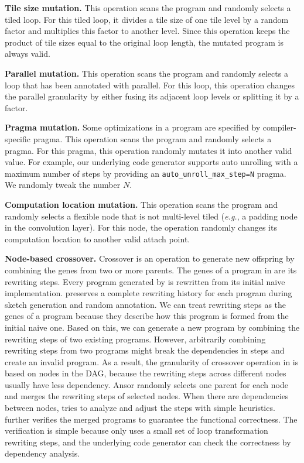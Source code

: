 \textbf{Tile size mutation.}
This operation scans the program and randomly selects a tiled loop.
For this tiled loop, it divides a tile size of one tile level by a random factor and multiplies this factor to another level.
Since this operation keeps the product of tile sizes equal to the original loop length, the mutated program is always valid.

\textbf{Parallel mutation.}
This operation scans the program and randomly selects a loop that has been annotated with parallel. 
For this loop, this operation changes the parallel granularity by either fusing its adjacent loop levels or splitting it by a factor.

\textbf{Pragma mutation.}
Some optimizations in a program are specified by compiler-specific pragma. This operation scans the program and randomly selects a pragma. For this pragma, this operation randomly mutates it into another valid value. For example, our underlying code generator supports auto unrolling with a maximum number of steps by providing an \texttt{auto\_unroll\_max\_step=N} pragma. We randomly tweak the number $N$.

\textbf{Computation location mutation.}
This operation scans the program and randomly selects a flexible node that is not multi-level tiled (\textit{e.g.}, a padding node in the convolution layer). For this node, the operation randomly changes its computation location to another valid attach point.

\textbf{Node-based crossover.}
Crossover is an operation to generate new offspring by combining the genes from two or more parents.
The genes of a program in \Ansor are its rewriting steps.
Every program generated by \Ansor is rewritten from its initial naive implementation.
\Ansor preserves a complete rewriting history for each program during sketch generation and random annotation.
We can treat rewriting steps as the genes of a program because they describe how this program is formed from the initial naive one.
Based on this, we can generate a new program by combining the rewriting steps of two existing programs.
However, arbitrarily combining rewriting steps from two programs might break the dependencies in steps and create an invalid program.
As a result, the granularity of crossover operation in \Ansor is based on nodes in the DAG, because the rewriting steps across different nodes usually have less dependency.
Ansor randomly selects one parent for each node and merges the rewriting steps of selected nodes.
When there are dependencies between nodes, \Ansor tries to analyze and adjust the steps with simple heuristics. \Ansor further verifies the merged programs to guarantee the functional correctness. The verification is simple because \Ansor only uses a small set of loop transformation rewriting steps, and the underlying code generator can check the correctness by dependency analysis.

